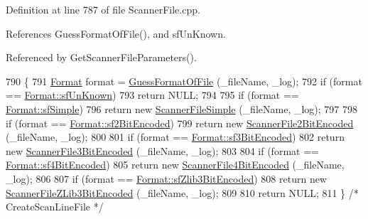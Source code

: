 Definition at line 787 of file Scanner\+File.\+cpp.



References Guess\+Format\+Of\+File(), and sf\+Un\+Known.



Referenced by Get\+Scanner\+File\+Parameters().


\begin{DoxyCode}
790 \{
791   \hyperlink{class_k_k_l_s_c_1_1_scanner_file_a9eb976c9d084a94db71a5e8d1fadb903}{Format}  format = \hyperlink{class_k_k_l_s_c_1_1_scanner_file_a45e82ab4379bd25600c1ffc184f652a4}{GuessFormatOfFile} (\_fileName, \_log);
792   \textcolor{keywordflow}{if}  (format == \hyperlink{class_k_k_l_s_c_1_1_scanner_file_a9eb976c9d084a94db71a5e8d1fadb903a46f124cef43c06139c2ae4bf3f9564d0}{Format::sfUnKnown})
793     \textcolor{keywordflow}{return} NULL;
794 
795   \textcolor{keywordflow}{if}  (format == \hyperlink{class_k_k_l_s_c_1_1_scanner_file_a9eb976c9d084a94db71a5e8d1fadb903a7230911a32d0f83589b687452a05523f}{Format::sfSimple})
796     \textcolor{keywordflow}{return} \textcolor{keyword}{new} \hyperlink{class_k_k_l_s_c_1_1_scanner_file_simple}{ScannerFileSimple} (\_fileName, \_log);
797 
798   \textcolor{keywordflow}{if}  (format == \hyperlink{class_k_k_l_s_c_1_1_scanner_file_a9eb976c9d084a94db71a5e8d1fadb903af3095a7a2ca6c23dfd11942c41a35d66}{Format::sf2BitEncoded})
799     \textcolor{keywordflow}{return} \textcolor{keyword}{new} \hyperlink{class_k_k_l_s_c_1_1_scanner_file2_bit_encoded}{ScannerFile2BitEncoded} (\_fileName, \_log);
800 
801   \textcolor{keywordflow}{if}  (format == \hyperlink{class_k_k_l_s_c_1_1_scanner_file_a9eb976c9d084a94db71a5e8d1fadb903a2a9330d778623273c413369a5f990849}{Format::sf3BitEncoded})
802     \textcolor{keywordflow}{return} \textcolor{keyword}{new} \hyperlink{class_k_k_l_s_c_1_1_scanner_file3_bit_encoded}{ScannerFile3BitEncoded} (\_fileName, \_log);
803 
804   \textcolor{keywordflow}{if}  (format == \hyperlink{class_k_k_l_s_c_1_1_scanner_file_a9eb976c9d084a94db71a5e8d1fadb903a624af7c88dcebdb27a791b18a6283325}{Format::sf4BitEncoded})
805     \textcolor{keywordflow}{return} \textcolor{keyword}{new} \hyperlink{class_k_k_l_s_c_1_1_scanner_file4_bit_encoded}{ScannerFile4BitEncoded} (\_fileName, \_log);
806 
807   \textcolor{keywordflow}{if}  (format == \hyperlink{class_k_k_l_s_c_1_1_scanner_file_a9eb976c9d084a94db71a5e8d1fadb903a560710b758d0e94469989a47d8891e5d}{Format::sfZlib3BitEncoded})
808     \textcolor{keywordflow}{return} \textcolor{keyword}{new} \hyperlink{class_k_k_l_s_c_1_1_scanner_file_z_lib3_bit_encoded}{ScannerFileZLib3BitEncoded} (\_fileName, \_log);
809 
810   \textcolor{keywordflow}{return} NULL;
811 \}  \textcolor{comment}{/* CreateScanLineFile */}
\end{DoxyCode}

